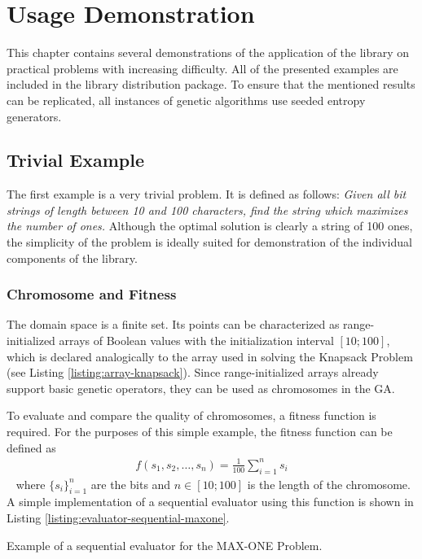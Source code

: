\chapter{Usage Demonstration}
This chapter contains several demonstrations of the application of the library on practical problems with increasing difficulty. All of the presented examples are included in the library distribution package. To ensure that the mentioned results can be replicated, all instances of genetic algorithms use seeded entropy generators.

\section{Trivial Example}
The first example is a very trivial problem. It is defined as follows: \textit{Given all bit strings of length between 10 and 100 characters, find the string which maximizes the number of ones.} Although the optimal solution is clearly a string of 100 ones, the simplicity of the problem is ideally suited for demonstration of the individual components of the library.

\subsection{Chromosome and Fitness}
The domain space is a finite set. Its points can be characterized as range-initialized arrays of Boolean values with the initialization interval $[10;100]$, which is declared analogically to the array used in solving the Knapsack Problem (see Listing \ref{listing:array-knapsack}). Since range-initialized arrays already support basic genetic operators, they can be used as chromosomes in the GA.

To evaluate and compare the quality of chromosomes, a fitness function is required. For the purposes of this simple example, the fitness function can be defined as
~
\begin{align}
	f(s_1, s_2, \dots, s_{n}) = \frac{1}{100}\sum_{i=1}^{n} s_i
\end{align}
~
where $\{s_i\}_{i=1}^{n}$ are the bits and $n\in[10;100]$ is the length of the chromosome. A simple implementation of a sequential evaluator using this function is shown in Listing \ref{listing:evaluator-sequential-maxone}.

\begin{listing}[ht]
	\caption{Example of a sequential evaluator for the MAX-ONE Problem.}
	\label{listing:evaluator-sequential-maxone}
\end{listing}

